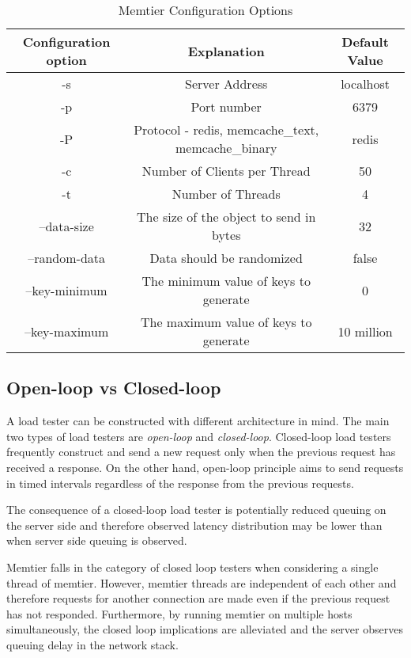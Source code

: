 \begin{table}[h!]
\centering
\begin{tabular}{| c c c |}
 \hline
 Configuration option & Explanation & Default Value\\ [0.5ex]
 \hline\hline

 -s & Server Address & localhost \\
 -p & Port number & 6379 \\
 -P & Protocol - redis, memcache\_text, memcache\_binary & redis \\
 -c & Number of Clients per Thread & 50 \\
 -t & Number of Threads & 4 \\
 --data-size & The size of the object to send in bytes & 32 \\
 --random-data & Data should be randomized & false \\
 --key-minimum & The minimum value of keys to generate & 0 \\
 --key-maximum & The maximum value of keys to generate & 10 million \\

 \hline

\end{tabular}
\caption{Memtier Configuration Options}
\label{tab:memtier_config}
\end{table}


\subsection{Open-loop vs Closed-loop}
A load tester can be constructed with different architecture in mind. The main two types of load testers are \textit{open-loop} and \textit{closed-loop}. Closed-loop load testers frequently construct and send a new request only when the previous request has received a response. On the other hand, open-loop principle aims to send requests in timed intervals regardless of the response from the previous requests.

The consequence of a closed-loop load tester is potentially reduced queuing on the server side and therefore observed latency distribution may be lower than when server side queuing is observed.

Memtier falls in the category of closed loop testers when considering a single thread of memtier. However, memtier threads are independent of each other and therefore requests for another connection are made even if the previous request has not responded. Furthermore, by running memtier on multiple hosts simultaneously, the closed loop implications are alleviated and the server observes queuing delay in the network stack.
